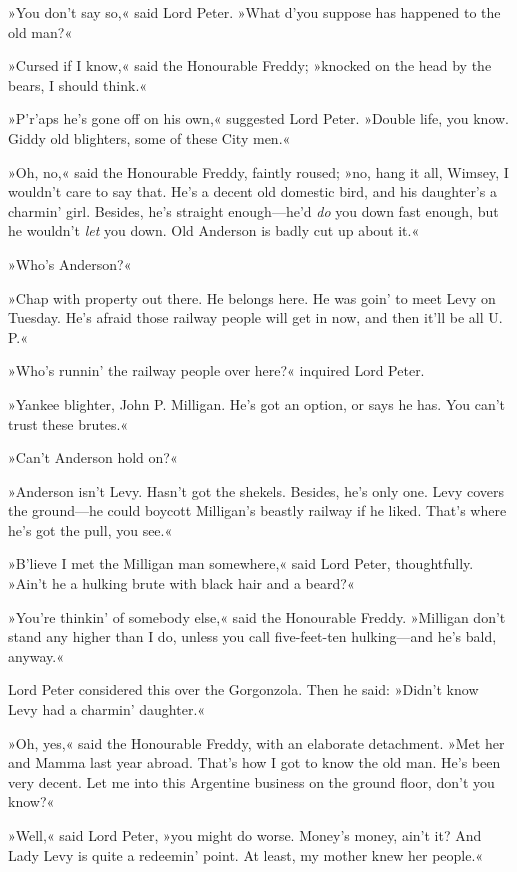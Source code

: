 »You don't say so,« said Lord Peter. »What d'you suppose has happened to the old man?«

»Cursed if I know,« said the Honourable Freddy; »knocked on the head by the bears, I should think.«

»P'r'aps he's gone off on his own,« suggested Lord Peter. »Double life, you know. Giddy old blighters, some of these City men.«

»Oh, no,« said the Honourable Freddy, faintly roused; »no, hang it all, Wimsey, I wouldn't care to say that. He's a decent old domestic bird, and his daughter's a charmin' girl. Besides, he's straight enough—he'd \textit{do} you down fast enough, but he wouldn't \textit{let} you down. Old Anderson is badly cut up about it.«

»Who's Anderson?«

»Chap with property out there. He belongs here. He was goin' to meet Levy on Tuesday. He's afraid those railway people will get in now, and then it'll be all U. P.«

»Who's runnin' the railway people over here?« inquired Lord Peter.

»Yankee blighter, John P. Milligan. He's got an option, or says he has. You can't trust these brutes.«

»Can't Anderson hold on?«

»Anderson isn't Levy. Hasn't got the shekels. Besides, he's only one. Levy covers the ground—he could boycott Milligan's beastly railway if he liked. That's where he's got the pull, you see.«

»B'lieve I met the Milligan man somewhere,« said Lord Peter, thoughtfully. »Ain't he a hulking brute with black hair and a beard?«

»You're thinkin' of somebody else,« said the Honourable Freddy. »Milligan don't stand any higher than I do, unless you call five-feet-ten hulking—and he's bald, anyway.«

Lord Peter considered this over the Gorgonzola. Then he said: »Didn't know Levy had a charmin' daughter.«

»Oh, yes,« said the Honourable Freddy, with an elaborate detachment. »Met her and Mamma last year abroad. That's how I got to know the old man. He's been very decent. Let me into this Argentine business on the ground floor, don't you know?«

»Well,« said Lord Peter, »you might do worse. Money's money, ain't it? And Lady Levy is quite a redeemin' point. At least, my mother knew her people.«

